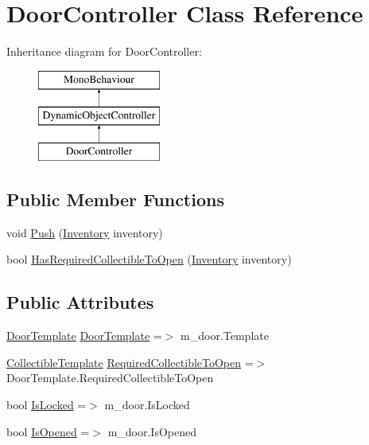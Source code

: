 \hypertarget{class_door_controller}{}\section{Door\+Controller Class Reference}
\label{class_door_controller}
Inheritance diagram for Door\+Controller\+:\begin{figure}[H]
\begin{center}
\leavevmode
\includegraphics[height=3.000000cm]{class_door_controller}
\end{center}
\end{figure}
\subsection*{Public Member Functions}
\begin{DoxyCompactItemize}
\item 
void \mbox{\hyperlink{class_door_controller_a09e628d8c58bf5b44b6cafb428da1400}{Push}} (\mbox{\hyperlink{class_inventory}{Inventory}} inventory)
\item 
bool \mbox{\hyperlink{class_door_controller_ae6bc3cbda562420279d49ea9f597a33c}{Has\+Required\+Collectible\+To\+Open}} (\mbox{\hyperlink{class_inventory}{Inventory}} inventory)
\end{DoxyCompactItemize}
\subsection*{Public Attributes}
\begin{DoxyCompactItemize}
\item 
\mbox{\hyperlink{class_door_template}{Door\+Template}} \mbox{\hyperlink{class_door_controller_a7452eb08846d9157a4b276f4ade576d5}{Door\+Template}} =$>$ m\+\_\+door.\+Template
\item 
\mbox{\hyperlink{class_collectible_template}{Collectible\+Template}} \mbox{\hyperlink{class_door_controller_a814a28fe8149a1d4f154f5f9817540ab}{Required\+Collectible\+To\+Open}} =$>$ Door\+Template.\+Required\+Collectible\+To\+Open
\item 
bool \mbox{\hyperlink{class_door_controller_aafbdd42297d3590affc4333f2319e178}{Is\+Locked}} =$>$ m\+\_\+door.\+Is\+Locked
\item 
bool \mbox{\hyperlink{class_door_controller_a156619b489a3c9cee3ea85eb1fc30823}{Is\+Opened}} =$>$ m\+\_\+door.\+Is\+Opened
\end{DoxyCompactItemize}
